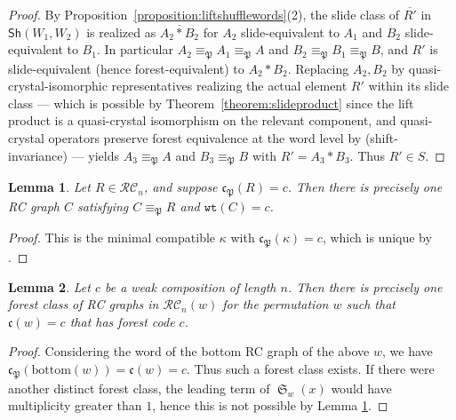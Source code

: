 \documentclass[pdflatex,sn-mathphys-num]{sn-jnl}
\numberwithin{equation}{subsection}
\DeclareMathOperator{\sch}{\mathfrak{S}}
\newcommand{\wtt}{\mathtt{wt}}
\newcommand{\RC}{\mathcal{RC}}
\newcommand{\code}{\mathfrak{c}}
\newcommand{\forest}{\mathfrak{P}}
\theoremstyle{thmstyleone}
\newtheorem{lemma}{Lemma}[subsection]
\theoremstyle{thmstylethree}
\theoremstyle{thmstyletwo}
\begin{document}
\begin{proof}
By Proposition~\ref{proposition:liftshufflewords}(2), the slide class of $\overline{R'}$ in $\mathsf{Sh}(W_1,W_2)$ is realized as $\overline{A_2*B_2}$ for $A_2$ slide-equivalent to $A_1$ and $B_2$ slide-equivalent to $B_1$. In particular $A_2\equiv_\forest A_1\equiv_\forest A$ and $B_2\equiv_\forest B_1\equiv_\forest B$, and $R'$ is slide-equivalent (hence forest-equivalent) to $A_2*B_2$. Replacing $A_2,B_2$ by quasi-crystal-isomorphic representatives realizing the actual element $R'$ within its slide class --- which is possible by Theorem~\ref{theorem:slideproduct} since the lift product is a quasi-crystal isomorphism on the relevant component, and quasi-crystal operators preserve forest equivalence at the word level by \cite[Proposition~5.8]{nadeau2024forest} (shift-invariance) --- yields $A_3\equiv_\forest A$ and $B_3\equiv_\forest B$ with $R'=A_3*B_3$. Thus $R'\in S$.
\end{proof}



\begin{lemma} \label{lemma:forestlead}
Let $R\in \RC_n$, and suppose $\code_\forest(R) = c$. Then there is precisely one RC graph $C$ satisfying $C\equiv_\forest R$ and $\wtt(C) = c$.
\end{lemma}
\begin{proof}
This is the minimal compatible $\kappa$ with $\code_\forest(\kappa) = c$, which is unique by \cite[Lemma~3.12]{nadeau2024forest}.
\end{proof}

\begin{lemma} \label{lemma:forestchoice}
  Let $c$ be a weak composition of length $n$. Then there is precisely one forest class of RC graphs in $\RC_n(w)$ for the permutation $w$ such that $\code(w)=c$ that has forest code $c$.
\end{lemma}
\begin{proof}
Considering the word of the bottom RC graph of the above $w$, we have $\code_\forest(\mathrm{bottom}(w)) = \code(w) = c$. Thus such a forest class exists. If there were another distinct forest class, the leading term of $\sch_w(x)$ would have multiplicity greater than $1$, hence this is not possible by Lemma \ref{lemma:forestlead}.
\end{proof}
\end{document}
